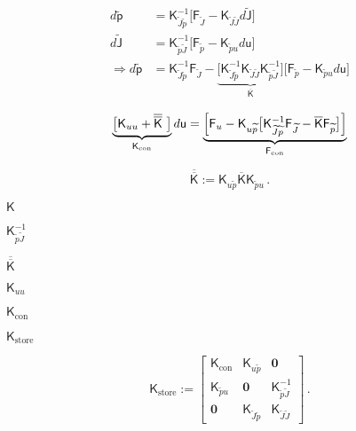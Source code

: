 \documentclass{article}
\begin{document}
\begin{align*} d \widetilde{\mathbf{\mathsf{p}}} & = \mathbf{\mathsf{K}}_{\widetilde{J}\widetilde{p}}^{-1} \bigl[ \mathbf{\mathsf{F}}_{\widetilde{J}} - \mathbf{\mathsf{K}}_{\widetilde{J}\widetilde{J}} d \widetilde{\mathbf{\mathsf{J}}} \bigr] \\ d \widetilde{\mathbf{\mathsf{J}}} & = \mathbf{\mathsf{K}}_{\widetilde{p}\widetilde{J}}^{-1} \bigl[ \mathbf{\mathsf{F}}_{\widetilde{p}} - \mathbf{\mathsf{K}}_{\widetilde{p}u} d \mathbf{\mathsf{u}} \bigr] \\ \Rightarrow d \widetilde{\mathbf{\mathsf{p}}} &= \mathbf{\mathsf{K}}_{\widetilde{J}\widetilde{p}}^{-1} \mathbf{\mathsf{F}}_{\widetilde{J}} - \underbrace{\bigl[\mathbf{\mathsf{K}}_{\widetilde{J}\widetilde{p}}^{-1} \mathbf{\mathsf{K}}_{\widetilde{J}\widetilde{J}} \mathbf{\mathsf{K}}_{\widetilde{p}\widetilde{J}}^{-1}\bigr]}_{\overline{\mathbf{\mathsf{K}}}}\bigl[ \mathbf{\mathsf{F}}_{\widetilde{p}} - \mathbf{\mathsf{K}}_{\widetilde{p}u} d \mathbf{\mathsf{u}} \bigr] \end{align*}
\pagebreak

\[ \underbrace{\bigl[ \mathbf{\mathsf{K}}_{uu} + \overline{\overline{\mathbf{\mathsf{K}}}}~ \bigr] }_{\mathbf{\mathsf{K}}_{\textrm{con}}} d \mathbf{\mathsf{u}} = \underbrace{ \Bigl[ \mathbf{\mathsf{F}}_{u} - \mathbf{\mathsf{K}}_{u\widetilde{p}} \bigl[ \mathbf{\mathsf{K}}_{\widetilde{J}\widetilde{p}}^{-1} \mathbf{\mathsf{F}}_{\widetilde{J}} - \overline{\mathbf{\mathsf{K}}}\mathbf{\mathsf{F}}_{\widetilde{p}} \bigr] \Bigr]}_{\mathbf{\mathsf{F}}_{\textrm{con}}} \]
\pagebreak

\[ \overline{\overline{\mathbf{\mathsf{K}}}} := \mathbf{\mathsf{K}}_{u\widetilde{p}} \overline{\mathbf{\mathsf{K}}} \mathbf{\mathsf{K}}_{\widetilde{p}u} \, . \]
\pagebreak

$\mathbf{\mathsf{K}}$
\pagebreak

$\mathbf{\mathsf{K}}_{\widetilde{p}\widetilde{J}}^{-1}$
\pagebreak

$\overline{\overline{\mathbf{\mathsf{K}}}}$
\pagebreak

$\mathbf{\mathsf{K}}_{uu}$
\pagebreak

$\mathbf{\mathsf{K}}_{\textrm{con}}$
\pagebreak

${\mathbf{\mathsf{K}}}_{\textrm{store}}$
\pagebreak

\[ \mathbf{\mathsf{K}}_{\textrm{store}} := \begin{bmatrix} \mathbf{\mathsf{K}}_{\textrm{con}} & \mathbf{\mathsf{K}}_{u\widetilde{p}} & \mathbf{0} \\ \mathbf{\mathsf{K}}_{\widetilde{p}u} & \mathbf{0} & \mathbf{\mathsf{K}}_{\widetilde{p}\widetilde{J}}^{-1} \\ \mathbf{0} & \mathbf{\mathsf{K}}_{\widetilde{J}\widetilde{p}} & \mathbf{\mathsf{K}}_{\widetilde{J}\widetilde{J}} \end{bmatrix} \, . \]
\pagebreak
\end{document}
